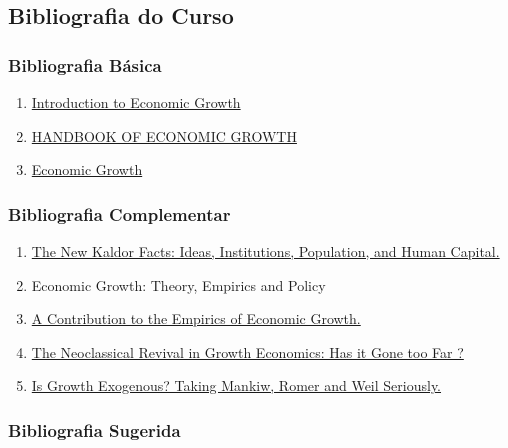 \documentclass[a4paper,12pt]{article}[abntex2]
\begin{document}
\subsection*{\textbf{Bibliografia do Curso}}

\subsubsection*{\textbf{Bibliografia Básica}}
\begin{enumerate}
    \item \href{https://pt.z-lib.gs/book/2924625/a4e361/introduction-to-economic-growth.html}{Introduction to Economic Growth}
    \item \href{https://pt.z-lib.gs/book/781830/8622be/handbook-of-economic-growth-part-1.html}{HANDBOOK OF ECONOMIC GROWTH }
    \item \href{https://pt.z-lib.gs/book/648133/6346dd/economic-growth-2nd-edition.html}{Economic Growth}
\end{enumerate}

\subsubsection*{\textbf{Bibliografia Complementar}}

\begin{enumerate}
    \item \href{https://web.stanford.edu/~chadj/JonesRomer2010.pdf}{The New Kaldor Facts:
Ideas, Institutions, Population, and Human Capital.}
    \item Economic Growth: Theory, Empirics and Policy
    \item \href{https://eml.berkeley.edu/~dromer/papers/MRW_QJE1992.pdf}{A Contribution to the Empirics of Economic Growth.}
    \item \href{https://pt.z-lib.gs/book/80443092/431c00/the-neoclassical-revival-in-growth-economics-has-it-gone-too-far.html}{The Neoclassical Revival in Growth Economics: Has it Gone too Far ? }
    \item \href{https://pt.z-lib.gs/book/91592388/82403c/is-growth-exogenous-taking-mankiw-romer-and-weil-seriously.html}{Is Growth Exogenous? Taking Mankiw, Romer and Weil Seriously.}
\end{enumerate}

\subsubsection*{\textbf{Bibliografia Sugerida}}
\end{document}
